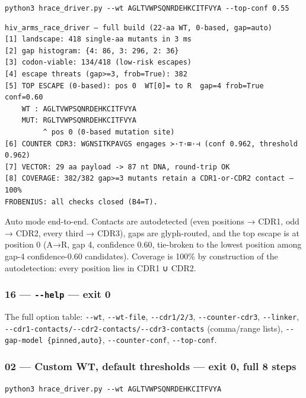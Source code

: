 \documentclass[12pt,a4paper]{article}
\begin{document}
\texttt{python3\ hrace\_driver.py\ -\/-wt\ AGLTVWPSQNRDEHKCITFVYA\ -\/-top-conf\ 0.55}

\begin{verbatim}
hiv_arms_race_driver — full build (22-aa WT, 0-based, gap=auto)
[1] landscape: 418 single-aa mutants in 3 ms
[2] gap histogram: {4: 86, 3: 296, 2: 36}
[3] codon-viable: 134/418 (low-risk escapes)
[4] escape threats (gap>=3, frob=True): 382
[5] TOP ESCAPE (0-based): pos 0  WT[0]= to R  gap=4 frob=True conf=0.60
    WT : AGLTVWPSQNRDEHKCITFVYA
    MUT: RGLTVWPSQNRDEHKCITFVYA
         ^ pos 0 (0-based mutation site)
[6] COUNTER CDR3: WGNSITKPAVGS engages ≻·⊤·⊞·⊣ (conf 0.962, threshold 0.962)
[7] VECTOR: 29 aa payload -> 87 nt DNA, round-trip OK
[8] COVERAGE: 382/382 gap>=3 mutants retain a CDR1-or-CDR2 contact — 100%
FROBENIUS: all checks closed (B4=T).
\end{verbatim}

Auto mode end-to-end. Contacts are autodetected (even positions → CDR1,
odd → CDR2, every third → CDR3), gaps are glyph-routed, and the top
escape is at position 0 (A→R, gap 4, confidence 0.60, tie-broken to the
lowest position among gap-4 confidence-0.60 candidates). Coverage is
100\% by construction of the autodetection: every position lies in CDR1
∪ CDR2.

\hypertarget{help-exit-0}{%
\subsubsection{\texorpdfstring{16 --- \texttt{-\/-help} --- exit
0}{16 --- -\/-help --- exit 0}}\label{help-exit-0}}

The full option table: \texttt{-\/-wt}, \texttt{-\/-wt-file},
\texttt{-\/-cdr1/2/3}, \texttt{-\/-counter-cdr3}, \texttt{-\/-linker},
\texttt{-\/-cdr1-contacts/-\/-cdr2-contacts/-\/-cdr3-contacts}
(comma/range lists), \texttt{-\/-gap-model\ \{pinned,auto\}},
\texttt{-\/-counter-conf}, \texttt{-\/-top-conf}.

\hypertarget{custom-wt-default-thresholds-exit-0-full-8-steps}{%
\subsubsection{02 --- Custom WT, default thresholds --- exit 0, full 8
steps}\label{custom-wt-default-thresholds-exit-0-full-8-steps}}

\texttt{python3\ hrace\_driver.py\ -\/-wt\ AGLTVWPSQNRDEHKCITFVYA}
\end{document}
